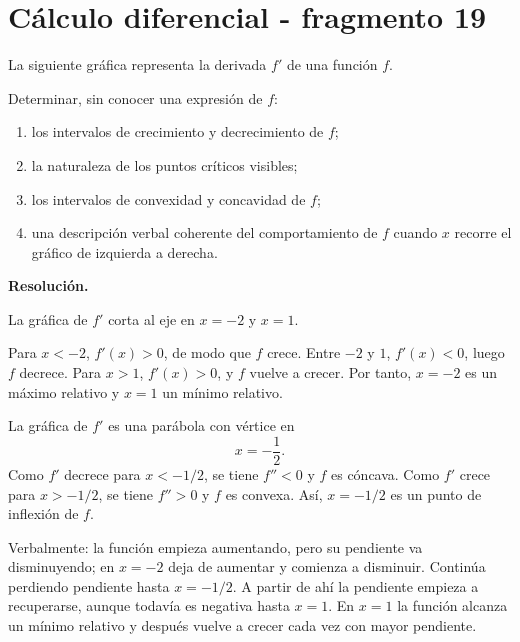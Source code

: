 \section{Cálculo diferencial - fragmento 19}
\begin{solvedexercise}
La siguiente gráfica representa la derivada $f'$ de una función $f$.

\begin{center}
\end{center}

Determinar, sin conocer una expresión de $f$:
\begin{enumerate}[label=\alph*)]
\item los intervalos de crecimiento y decrecimiento de $f$;
\item la naturaleza de los puntos críticos visibles;
\item los intervalos de convexidad y concavidad de $f$;
\item una descripción verbal coherente del comportamiento de $f$ cuando $x$ recorre el gráfico de izquierda a derecha.
\end{enumerate}

\textbf{Resolución.}\par\smallskip
La gráfica de $f'$ corta al eje en $x=-2$ y $x=1$.

Para $x<-2$, $f'(x)>0$, de modo que $f$ crece. Entre $-2$ y $1$, $f'(x)<0$, luego $f$ decrece. Para $x>1$, $f'(x)>0$, y $f$ vuelve a crecer. Por tanto, $x=-2$ es un máximo relativo y $x=1$ un mínimo relativo.

La gráfica de $f'$ es una parábola con vértice en
\[
x=-\frac12.
\]
Como $f'$ decrece para $x<-1/2$, se tiene $f''<0$ y $f$ es cóncava. Como $f'$ crece para $x>-1/2$, se tiene $f''>0$ y $f$ es convexa. Así, $x=-1/2$ es un punto de inflexión de $f$.

Verbalmente: la función empieza aumentando, pero su pendiente va disminuyendo; en $x=-2$ deja de aumentar y comienza a disminuir. Continúa perdiendo pendiente hasta $x=-1/2$. A partir de ahí la pendiente empieza a recuperarse, aunque todavía es negativa hasta $x=1$. En $x=1$ la función alcanza un mínimo relativo y después vuelve a crecer cada vez con mayor pendiente.
\end{solvedexercise}

